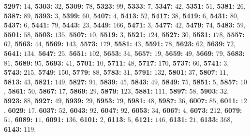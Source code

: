 \textsf{\bfseries 5297:} $14$, \textsf{\bfseries 5303:} $32$, \textsf{\bfseries 5309:} $78$, \textsf{\bfseries 5323:} $99$, \textsf{\bfseries 5333:} $7$, \textsf{\bfseries 5347:} $42$, \textsf{\bfseries 5351:} $51$, \textsf{\bfseries 5381:} $26$, \textsf{\bfseries 5387:} $89$, \textsf{\bfseries 5393:} $3$, \textsf{\bfseries 5399:} $60$, \textsf{\bfseries 5407:} $4$, \textsf{\bfseries 5413:} $52$, \textsf{\bfseries 5417:} $38$, \textsf{\bfseries 5419:} $6$, \textsf{\bfseries 5431:} $80$, \textsf{\bfseries 5437:} $6$, \textsf{\bfseries 5441:} $79$, \textsf{\bfseries 5443:} $23$, \textsf{\bfseries 5449:} $166$, \textsf{\bfseries 5471:} $3$, \textsf{\bfseries 5477:} $42$, \textsf{\bfseries 5479:} $74$, \textsf{\bfseries 5483:} $59$, \textsf{\bfseries 5501:} $58$, \textsf{\bfseries 5503:} $135$, \textsf{\bfseries 5507:} $10$, \textsf{\bfseries 5519:} $3$, \textsf{\bfseries 5521:} $124$, \textsf{\bfseries 5527:} $30$, \textsf{\bfseries 5531:} $178$, \textsf{\bfseries 5557:} $62$, \textsf{\bfseries 5563:} $44$, \textsf{\bfseries 5569:} $143$, \textsf{\bfseries 5573:} $179$, \textsf{\bfseries 5581:} $43$, \textsf{\bfseries 5591:} $78$, \textsf{\bfseries 5623:} $62$, \textsf{\bfseries 5639:} $72$, \textsf{\bfseries 5641:} $134$, \textsf{\bfseries 5647:} $25$, \textsf{\bfseries 5651:} $102$, \textsf{\bfseries 5653:} $34$, \textsf{\bfseries 5657:} $19$, \textsf{\bfseries 5659:} $49$, \textsf{\bfseries 5669:} $79$, \textsf{\bfseries 5683:} $81$, \textsf{\bfseries 5689:} $95$, \textsf{\bfseries 5693:} $41$, \textsf{\bfseries 5701:} $10$, \textsf{\bfseries 5711:} $48$, \textsf{\bfseries 5717:} $170$, \textsf{\bfseries 5737:} $60$, \textsf{\bfseries 5741:} $3$, \textsf{\bfseries 5743:} $215$, \textsf{\bfseries 5749:} $150$, \textsf{\bfseries 5779:} $88$, \textsf{\bfseries 5783:} $31$, \textsf{\bfseries 5791:} $132$, \textsf{\bfseries 5801:} $37$, \textsf{\bfseries 5807:} $11$, \textsf{\bfseries 5813:} $43$, \textsf{\bfseries 5821:} $149$, \textsf{\bfseries 5827:} $91$, \textsf{\bfseries 5839:} $45$, \textsf{\bfseries 5843:} $49$, \textsf{\bfseries 5849:} $75$, \textsf{\bfseries 5851:} $5$, \textsf{\bfseries 5857:} $10$, \textsf{\bfseries 5861:} $50$, \textsf{\bfseries 5867:} $17$, \textsf{\bfseries 5869:} $29$, \textsf{\bfseries 5879:} $123$, \textsf{\bfseries 5881:} $111$, \textsf{\bfseries 5897:} $58$, \textsf{\bfseries 5903:} $32$, \textsf{\bfseries 5923:} $88$, \textsf{\bfseries 5927:} $49$, \textsf{\bfseries 5939:} $29$, \textsf{\bfseries 5953:} $79$, \textsf{\bfseries 5981:} $48$, \textsf{\bfseries 5987:} $36$, \textsf{\bfseries 6007:} $85$, \textsf{\bfseries 6011:} $12$, \textsf{\bfseries 6029:} $17$, \textsf{\bfseries 6037:} $52$, \textsf{\bfseries 6043:} $92$, \textsf{\bfseries 6047:} $92$, \textsf{\bfseries 6053:} $34$, \textsf{\bfseries 6067:} $4$, \textsf{\bfseries 6073:} $212$, \textsf{\bfseries 6079:} $51$, \textsf{\bfseries 6089:} $11$, \textsf{\bfseries 6091:} $136$, \textsf{\bfseries 6101:} $2$, \textsf{\bfseries 6113:} $5$, \textsf{\bfseries 6121:} $146$, \textsf{\bfseries 6131:} $21$, \textsf{\bfseries 6133:} $368$, \textsf{\bfseries 6143:} $119$, 

